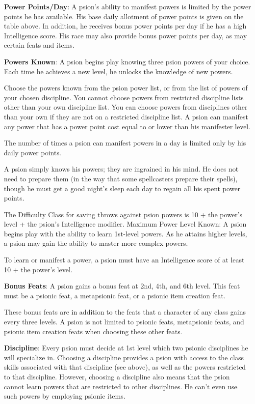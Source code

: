 \textbf{Power Points/Day}: A psion's ability to manifest powers is limited by the power points he has available. His base daily allotment of power points is given on the table above. In addition, he receives bonus power points per day if he has a high Intelligence score. His race may also provide bonus power points per day, as may certain feats and items.

\textbf{Powers Known}: A psion begins play knowing three psion powers of your choice. Each time he achieves a new level, he unlocks the knowledge of new powers.

Choose the powers known from the psion power list, or from the list of powers of your chosen discipline. You cannot choose powers from restricted discipline lists other than your own discipline list. You can choose powers from disciplines other than your own if they are not on a restricted discipline list. A psion can manifest any power that has a power point cost equal to or lower than his manifester level.

The number of times a psion can manifest powers in a day is limited only by his daily power points.

A psion simply knows his powers; they are ingrained in his mind. He does not need to prepare them (in the way that some spellcasters prepare their spells), though he must get a good night's sleep each day to regain all his spent power points.

The Difficulty Class for saving throws against psion powers is 10 + the power's level + the psion's Intelligence modifier. Maximum Power Level Known: A psion begins play with the ability to learn 1st-level powers. As he attains higher levels, a psion may gain the ability to master more complex powers.

To learn or manifest a power, a psion must have an Intelligence score of at least 10 + the power's level.

\textbf{Bonus Feats}: A psion gains a bonus feat at 2nd, 4th, and 6th level. This feat must be a psionic feat, a metapsionic feat, or a psionic item creation feat.

These bonus feats are in addition to the feats that a character of any class gains every three levels. A psion is not limited to psionic feats, metapsionic feats, and psionic item creation feats when choosing these other feats.

\textbf{Discipline}: Every psion must decide at 1st level which two psionic disciplines he will specialize in. Choosing a discipline provides a psion with access to the class skills associated with that discipline (see above), as well as the powers restricted to that discipline. However, choosing a discipline also means that the psion cannot learn powers that are restricted to other disciplines. He can't even use such powers by employing psionic items.

